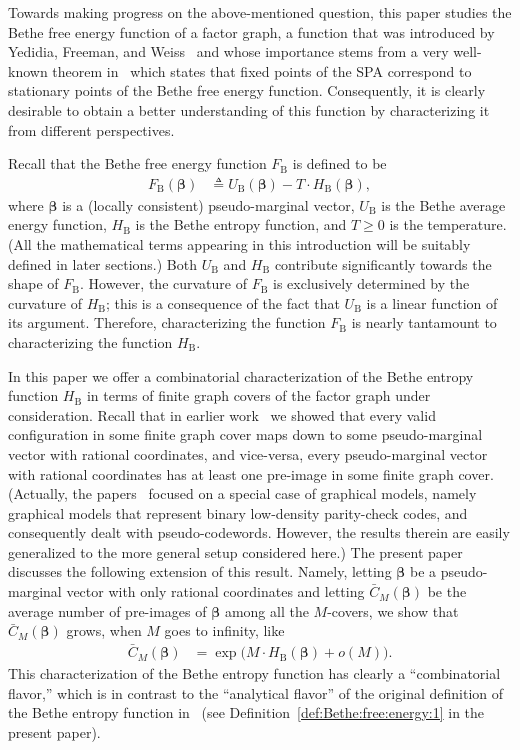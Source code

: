 \documentclass[journal, twocolumn]{IEEEtran}
\renewcommand{\geq}{\geqslant}
\newcommand{\defeq}{\triangleq}
\newcommand{\bel}{\beta}
\newcommand{\vbel}{\boldsymbol{\bel}}
\newcommand{\FBethe}{F_{\mathrm{B}}}
\newcommand{\UBethe}{U_{\mathrm{B}}}
\newcommand{\HBethe}{H_{\mathrm{B}}}
\newcommand{\?}{\mathrm{?}}
\begin{document}
Towards making progress on the above-mentioned question, this paper studies the
Bethe free energy function of a factor graph, a function that was introduced
by Yedidia, Freeman, and Weiss~\cite{Yedidia:Freeman:Weiss:05:1} and whose
importance stems from a very well-known theorem
in~\cite{Yedidia:Freeman:Weiss:05:1} which states that fixed points of the SPA
correspond to stationary points of the Bethe free energy
function. Consequently, it is clearly desirable to obtain a better
understanding of this function by characterizing it from different
perspectives.

Recall that the Bethe free energy function $\FBethe$ is defined to be
\begin{align*}
  \FBethe(\vbel)
    &\defeq
       \UBethe(\vbel)
       -
       T
       \cdot
       \HBethe(\vbel),
\end{align*}
where $\vbel$ is a (locally consistent) pseudo-marginal vector, $\UBethe$ is
the Bethe average energy function, $\HBethe$ is the Bethe entropy function,
and $T \! \geq \! 0$ is the temperature. (All the mathematical terms appearing
in this introduction will be suitably defined in later sections.) Both
$\UBethe$ and $\HBethe$ contribute significantly towards the shape of
$\FBethe$. However, the curvature of $\FBethe$ is exclusively determined by
the curvature of $\HBethe$; this is a consequence of the fact that $\UBethe$
is a linear function of its argument. Therefore, characterizing the function
$\FBethe$ is nearly tantamount to characterizing the function $\HBethe$.


In this paper we offer a combinatorial characterization of the Bethe entropy
function $\HBethe$ in terms of finite graph covers of the factor graph under
consideration. Recall that in earlier work~\cite{Koetter:Vontobel:03:1,
  Vontobel:Koetter:05:1:subm} we showed that every valid configuration in some
finite graph cover maps down to some pseudo-marginal vector with rational
coordinates, and vice-versa, every pseudo-marginal vector with rational
coordinates has at least one pre-image in some finite graph cover. (Actually,
the papers~\cite{Koetter:Vontobel:03:1, Vontobel:Koetter:05:1:subm} focused on
a special case of graphical models, namely graphical models that represent
binary low-density parity-check codes, and consequently dealt with
pseudo-codewords. However, the results therein are easily generalized to the
more general setup considered here.) The present paper discusses the following
extension of this result. Namely, letting $\vbel$ be a pseudo-marginal vector
with only rational coordinates and letting $\bar C_M(\vbel)$ be the average
number of pre-images of $\vbel$ among all the $M$-covers, we show that $\bar
C_M(\vbel)$ grows, when $M$ goes to infinity, like
\begin{align*}
  \bar C_M(\vbel)
    &= \exp 
         \big( 
           M \cdot \HBethe(\vbel)
           +
           o(M)
         \big).
\end{align*}
This characterization of the Bethe entropy function has clearly a
``combinatorial flavor,'' which is in contrast to the ``analytical flavor'' of
the original definition of the Bethe entropy function
in~\cite{Yedidia:Freeman:Weiss:05:1} (see
Definition~\ref{def:Bethe:free:energy:1} in the present paper).
\end{document}
